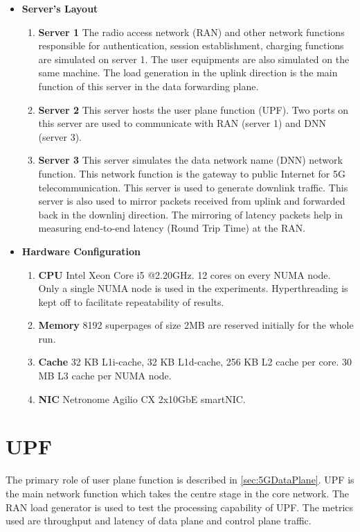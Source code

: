  \begin{itemize} 
        \item \textbf{Server's Layout}
        \begin{enumerate}
                \item \textbf{Server 1} The radio access network (RAN) and other network functions responsible for authentication,
         session establishment, charging functions are simulated on server 1.  The user equipments are also 
         simulated on the same machine. The load generation in the uplink direction is the main function of this server in the data forwarding plane.
                \item \textbf{Server 2} This server hosts the user plane function
		 (UPF). Two ports on this server are used to communicate with RAN 
         (server 1) and DNN (server 3).
                 \item \textbf{Server 3} This server simulates the data network name (DNN) network function. This network 
        function is the gateway to public Internet for 5G telecommunication. This server is used to generate downlink traffic. This server is also used to mirror packets received from uplink and forwarded back in the downlinj direction. The mirroring of latency packets help in measuring end-to-end latency (Round Trip Time) at the RAN. 
        \end{enumerate} 
        \item \textbf{Hardware Configuration} 
        \begin{enumerate}
                \item \textbf{CPU} Intel Xeon Core i5 @2.20GHz. 12 cores on every NUMA node. Only a single NUMA node is used in the experiments. Hyperthreading is kept off to facilitate repeatability of results.
                \item \textbf{Memory} 8192 superpages of size 2MB are reserved initially for the whole run.
                \item \textbf{Cache} 32 KB L1i-cache, 32 KB L1d-cache, 256 KB L2 cache per core. 30 MB L3 cache per NUMA node. 
                \item \textbf{NIC} Netronome Agilio CX 2x10GbE smartNIC.
	       \end{enumerate}
        
\end{itemize}

\section{UPF}
The primary role of user plane function is described in \ref{sec:5GDataPlane}. UPF is the main network function which takes the centre stage in the core network. The RAN load generator is used to test the processing capability of UPF. The metrics used are throughput and latency of data plane and control plane traffic. 

